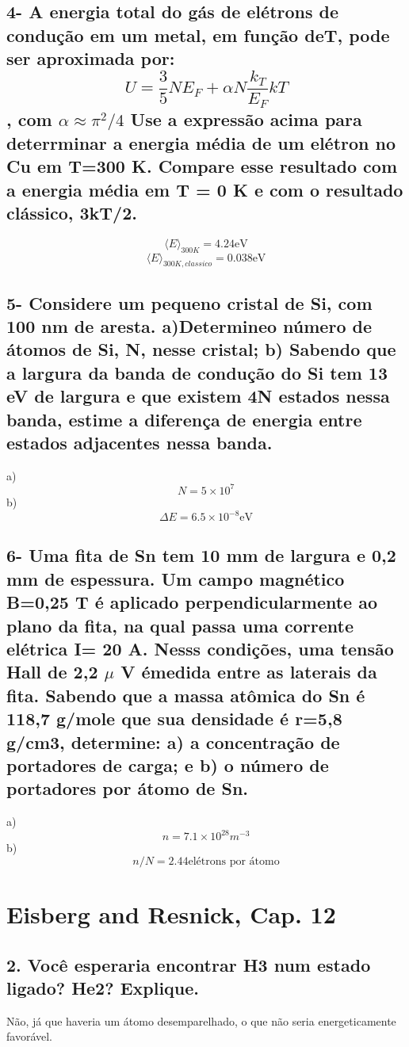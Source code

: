 \documentclass{article}
\begin{document}
\subsection{4- A energia total do gás de elétrons de condução em um metal, em função deT, pode ser aproximada por:
\[ U = \frac{3}{5}N E_F 
+ \alpha N \frac{k_T}{E_F} kT\],
com $\alpha \approx \pi ^2/4$
Use a expressão acima para deterrminar a energia média de um elétron no Cu em T=300 K. 
Compare esse resultado com a energia média em T = 0 K e com o resultado clássico, 3kT/2.}
\[ \langle  E \rangle_{300 K} =  4.24 \text{eV}\]
\[ \langle  E \rangle_{300 K, classico} = 0.038 \text{eV}\]

\subsection{5- Considere um pequeno cristal de Si, com 100 nm de aresta. a)Determineo número de átomos de Si, N, nesse cristal; b) Sabendo que a largura da banda de condução do Si tem 13 eV de largura e que existem 4N estados nessa banda, estime a diferença de energia entre estados adjacentes nessa banda.}
a) \[ N = 5 \times 10^7\]
b) \[ \Delta E = 6.5 \times 10^{-8} \text{eV}\]

\subsection{6- Uma fita de Sn tem 10 mm de largura e 0,2 mm de espessura. Um campo magnético B=0,25 T é aplicado perpendicularmente ao plano da fita, na qual passa uma corrente elétrica I= 20 A. Nesss condições, uma tensão Hall de 2,2 $\mu$ V émedida entre as laterais da fita. Sabendo que a massa atômica do Sn é 118,7 g/mole que sua densidade é r=5,8 g/cm3, determine: 
a) a concentração de portadores de carga; e 
b) o número de portadores por átomo de Sn.}
a) \[ n = 7.1 \times 10^{28} m^{-3}\]
b) \[ n/N =  2.44 \text{elétrons por átomo}\]

\section{Eisberg and Resnick, Cap. 12}
 
\subsection{2. Você esperaria encontrar H3 num estado ligado? He2? Explique.}
Não, já que haveria um átomo desemparelhado, o que não seria energeticamente favorável.
\end{document}
